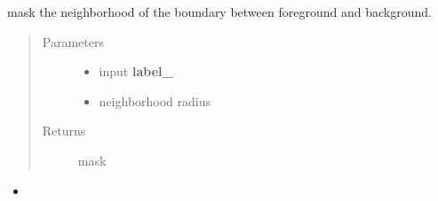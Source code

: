 \documentclass[letterpaper,10pt,english]{sphinxmanual}
\begin{document}
\begin{fulllineitems}
\label{\detokenize{index:unet.loss.mask_boundary_neighborhood}}
mask the neighborhood of the boundary between foreground and background.
\begin{quote}\begin{description}
\item[{Parameters}] \leavevmode\begin{itemize}
\item {} 
 \textendash{} input {\color{red}\bfseries{}label\_}

\item {} 
 \textendash{} neighborhood radius

\end{itemize}

\item[{Returns}] \leavevmode
mask

\end{description}\end{quote}



\begin{itemize}
\item {} 
{\hyperref[\detokenize{index:unet.loss.weighted_cross_entropy_with_boundary}]{}}

\end{itemize}



\end{fulllineitems}

\end{document}
